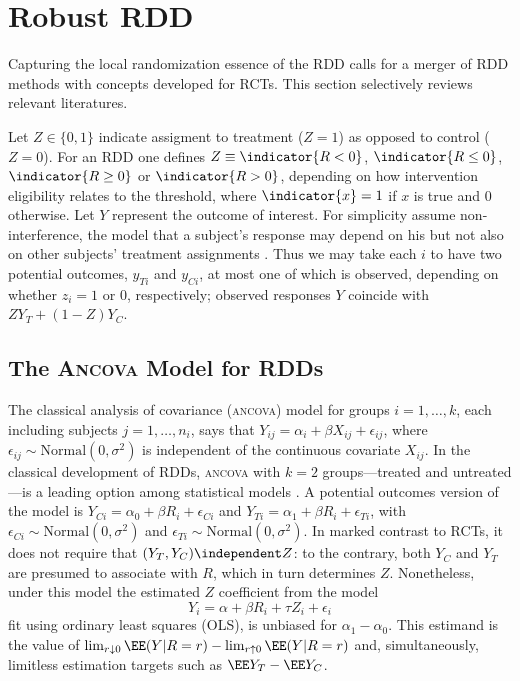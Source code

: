 \section{Robust RDD}
Capturing the local randomization essence of the RDD calls for
a merger of RDD methods with concepts developed for RCTs. This
section selectively reviews relevant literatures.

Let $Z \in \{0,1\}$ indicate assigment to treatment ($Z=1$) as opposed to control
($Z=0$).  For an RDD one defines $Z \equiv \indicator{R< 0}$,
$\indicator{R \leq 0}$, $\indicator{R\geq 0}$ or $\indicator{R > 0}$,
depending on how intervention eligibility relates to the threshold,
where $\indicator{x}=1$ if $x$ is true and $0$ otherwise.
Let $Y$ represent the outcome of interest.
For simplicity assume non-interference, the model that
a subject's response may depend on his but not also on other subjects'
treatment assignments \citep{cox:1958,rubin:1978}.  Thus we may take each $i$
to have two potential outcomes, $y_{Ti}$ and $y_{Ci}$, at most one of which is observed, depending on whether $z_i=1$ or $0$, respectively;
 observed
responses $Y$ coincide with $ZY_{T}+(1-Z)Y_{C}$.


\subsection{The \textsc{Ancova} Model for RDDs}\label{sec:robust-analys-covar}

The classical analysis of covariance (\textsc{ancova}) model for
groups $i=1,\ldots, k$, each including subjects $j=1, \ldots, n_{i}$,
says that
$Y_{ij} = \alpha_{i} + \beta X_{ij} + \epsilon_{ij}$, where $\epsilon_{ij}
\sim \mathrm{Normal}(0, \sigma^{2})$ is independent of the continuous
covariate $X_{ij}$.
In the classical development of RDDs, \textsc{ancova} with $k=2$
groups---treated and untreated---is a leading option among statistical
models
\citep{thistlethwaite1960regression}.
A potential outcomes version of the model is
 $Y_{Ci} = \alpha_{0} + \beta R_{i} + \epsilon_{Ci}$ and
$Y_{Ti} = \alpha_{1}  + \beta R_{i} + \epsilon_{Ti}$, with
 $\epsilon_{Ci} \sim \mathrm{Normal}(0, \sigma^{2})$ and
 $\epsilon_{Ti} \sim \mathrm{Normal}(0, \sigma^{2})$.
In marked contrast to RCTs, it does
not require that $(Y_{T}, Y_{C}) \independent Z$: to the contrary, both
$Y_{C}$ and $Y_{T}$ are presumed to associate with $R$, which in turn
determines $Z$. 
Nonetheless, under this model the estimated $Z$ coefficient from the
model
\begin{equation}\label{eq:classicOLS}
Y_i=\alpha+\beta R_i+\tau Z_i+\epsilon_i
\end{equation}
fit using ordinary least squares (OLS), is unbiased for
$\alpha_{1} - \alpha_{0}$. 
This estimand is the value of  $\lim_{r\downarrow 0} \EE(Y | R=r) -
\lim_{r\uparrow 0} \EE(Y | R=r)$ and, simultaneously,
limitless estimation targets such as $\EE Y_{T}  - \EE Y_{C}$.

